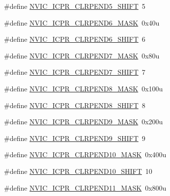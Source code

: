 \begin{DoxyCompactItemize}
\item 
\#define \hyperlink{group___n_v_i_c___register___masks_gaa4820cd94daae75b1d798222e2d7e2cf}{N\+V\+I\+C\+\_\+\+I\+C\+P\+R\+\_\+\+C\+L\+R\+P\+E\+N\+D5\+\_\+\+S\+H\+I\+FT}~5
\item 
\#define \hyperlink{group___n_v_i_c___register___masks_ga0b11fb0bba8cb78429cc4826b82358b1}{N\+V\+I\+C\+\_\+\+I\+C\+P\+R\+\_\+\+C\+L\+R\+P\+E\+N\+D6\+\_\+\+M\+A\+SK}~0x40u
\item 
\#define \hyperlink{group___n_v_i_c___register___masks_ga8e87146dd471dfac1c9b7f1c5725f10b}{N\+V\+I\+C\+\_\+\+I\+C\+P\+R\+\_\+\+C\+L\+R\+P\+E\+N\+D6\+\_\+\+S\+H\+I\+FT}~6
\item 
\#define \hyperlink{group___n_v_i_c___register___masks_gaa6350a35ac3bc2b7e66bbb91a0fa8b9d}{N\+V\+I\+C\+\_\+\+I\+C\+P\+R\+\_\+\+C\+L\+R\+P\+E\+N\+D7\+\_\+\+M\+A\+SK}~0x80u
\item 
\#define \hyperlink{group___n_v_i_c___register___masks_ga8536004c28881390298071ed6e60df48}{N\+V\+I\+C\+\_\+\+I\+C\+P\+R\+\_\+\+C\+L\+R\+P\+E\+N\+D7\+\_\+\+S\+H\+I\+FT}~7
\item 
\#define \hyperlink{group___n_v_i_c___register___masks_gab0d93f2fe3d6efb485bba0ed1a7e5aec}{N\+V\+I\+C\+\_\+\+I\+C\+P\+R\+\_\+\+C\+L\+R\+P\+E\+N\+D8\+\_\+\+M\+A\+SK}~0x100u
\item 
\#define \hyperlink{group___n_v_i_c___register___masks_gafef0e6dc644369e9a4fd7858ec6b242d}{N\+V\+I\+C\+\_\+\+I\+C\+P\+R\+\_\+\+C\+L\+R\+P\+E\+N\+D8\+\_\+\+S\+H\+I\+FT}~8
\item 
\#define \hyperlink{group___n_v_i_c___register___masks_ga46f4fdfde091c3b7b723286cb632fd73}{N\+V\+I\+C\+\_\+\+I\+C\+P\+R\+\_\+\+C\+L\+R\+P\+E\+N\+D9\+\_\+\+M\+A\+SK}~0x200u
\item 
\#define \hyperlink{group___n_v_i_c___register___masks_ga529e8cc2304d9cea0c3b6f8252eeac4a}{N\+V\+I\+C\+\_\+\+I\+C\+P\+R\+\_\+\+C\+L\+R\+P\+E\+N\+D9\+\_\+\+S\+H\+I\+FT}~9
\item 
\#define \hyperlink{group___n_v_i_c___register___masks_gad27f8da139c67a8a3b93d443b641dd1d}{N\+V\+I\+C\+\_\+\+I\+C\+P\+R\+\_\+\+C\+L\+R\+P\+E\+N\+D10\+\_\+\+M\+A\+SK}~0x400u
\item 
\#define \hyperlink{group___n_v_i_c___register___masks_gabca597cdbc52f88130ab13c72d047657}{N\+V\+I\+C\+\_\+\+I\+C\+P\+R\+\_\+\+C\+L\+R\+P\+E\+N\+D10\+\_\+\+S\+H\+I\+FT}~10
\item 
\#define \hyperlink{group___n_v_i_c___register___masks_ga51b2644d6ade462bebaae249fe11f89b}{N\+V\+I\+C\+\_\+\+I\+C\+P\+R\+\_\+\+C\+L\+R\+P\+E\+N\+D11\+\_\+\+M\+A\+SK}~0x800u

\end{DoxyCompactItemize}
